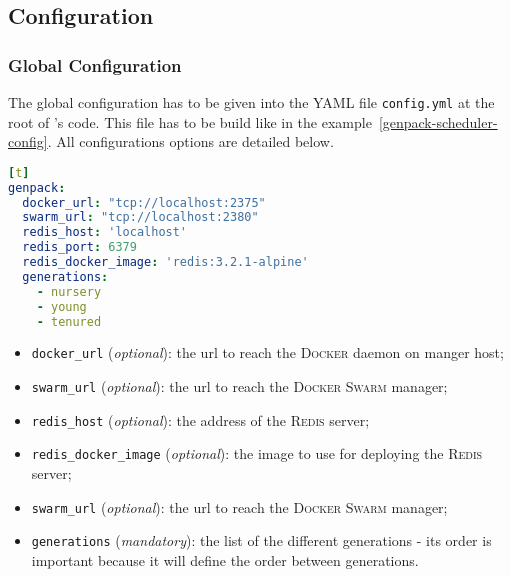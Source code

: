 
\subsection{Configuration}
\label{subsec:genpacksetup:config}

\subsubsection{Global Configuration}

The global configuration has to be given into the YAML file \texttt{config.yml} at the root of \GP{}'s code.
This file has to be build like in the example~\ref{genpack-scheduler-config}.
All configurations options are detailed below.

\begin{minipage}{\linewidth} %
\begin{lstlisting}[language=YAML,caption={Configuration file example for \GP{} scheduler.},label=genpack-scheduler-config][t]
genpack:
  docker_url: "tcp://localhost:2375"
  swarm_url: "tcp://localhost:2380"
  redis_host: 'localhost'
  redis_port: 6379
  redis_docker_image: 'redis:3.2.1-alpine'
  generations:
    - nursery
    - young
    - tenured
\end{lstlisting}
\end{minipage}

\begin{itemize}
  \item \texttt{docker\_url} (\emph{optional}): the url to reach the \textsc{Docker} daemon on manger host;
  \item \texttt{swarm\_url} (\emph{optional}): the url to reach the \textsc{Docker Swarm} manager;
  \item \texttt{redis\_host} (\emph{optional}): the address of the \textsc{Redis} server;
  \item \texttt{redis\_docker\_image} (\emph{optional}): the image to use for deploying the \textsc{Redis} server;
  \item \texttt{swarm\_url} (\emph{optional}): the url to reach the \textsc{Docker Swarm} manager;
  \item \texttt{generations} (\emph{mandatory}): the list of the different generations - its order is important because it will define the order between generations.
\end{itemize}

